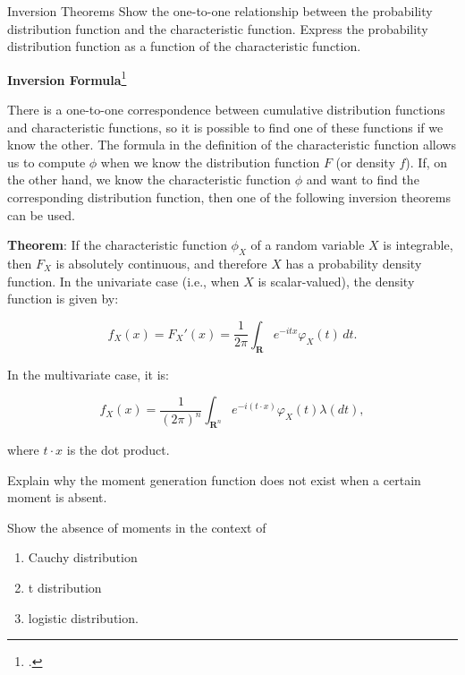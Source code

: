 \documentclass[UTF8,a4paper,10pt]{article}
\begin{document}







\begin{Problem}[]{Inversion Theorems}
  Show the one-to-one relationship between the probability distribution function and the characteristic function. Express the probability distribution function as a function of the characteristic function.

\end{Problem}

\textbf{Inversion Formula}\Footcite{Characteristic_function_wiki}

There is a one-to-one correspondence between cumulative distribution functions and characteristic functions, so it is possible to find one of these functions if we know the other. The formula in the definition of the characteristic function allows us to compute $\phi$ when we know the distribution function $F$ (or density $f$). If, on the other hand, we know the characteristic function $\phi$ and want to find the corresponding distribution function, then one of the following inversion theorems can be used.

\textbf{Theorem}: If the characteristic function $\phi_X$ of a random variable $X$ is integrable, then $F_X$ is absolutely continuous, and therefore $X$ has a probability density function. In the univariate case (i.e., when $X$ is scalar-valued), the density function is given by:

\[
f_{X}(x)=F_{X}'(x)=\frac{1}{2\pi}\int_{\mathbf{R}}e^{-itx}\varphi_{X}(t)\,dt.
\]

In the multivariate case, it is:

\[
f_{X}(x)=\frac{1}{(2\pi)^{n}}\int_{\mathbf{R}^{n}}e^{-i(t\cdot x)}\varphi_{X}(t)\lambda (dt),
\]

where $t\cdot x$ is the dot product.


\pagebreak

\begin{Problem}[]{}
  Explain why the moment generation function does not exist when a certain moment is absent. 
  
  Show the absence of moments in the context of 
  \begin{enumerate}
    \item Cauchy distribution
    \item t distribution
    \item logistic distribution.
  \end{enumerate}


\end{Problem}
\end{document}
